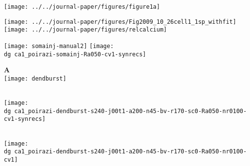 \documentclass{article}
\newcommand{\dg}{}              %
\newlength{\colwidth}
\newcommand{\figtitle}[1]{}
\begin{document}

\fontsize{8}{20}\selectfont

\figtitle{Figure 1}

\vspace{\baselineskip}

\noindent\texttt{[image: ../../journal-paper/figures/figure1a]}
\begin{minipage}[b]{0.5\colwidth}
\texttt{[image: ../../journal-paper/figures/Fig2009\_10\_26cell1\_1sp\_withfit]}  
\texttt{[image: ../../journal-paper/figures/relcalcium]}  
\end{minipage}
\texttt{[image: somainj-manual2]}
\texttt{[image: \\dg ca1\_poirazi-somainj-Ra050-cv1-synrecs]}





\pagebreak[4]

\figtitle{Figure 2}

\vspace{\baselineskip}

\noindent
\begin{minipage}[t]{0.5\colwidth}
  \textbf{A}\\
    \texttt{[image: dendburst]}
\end{minipage}
\begin{minipage}[t]{0.5\colwidth}
  \mbox{}\\[-0.5\baselineskip]
  \texttt{[image: \\dg ca1\_poirazi-dendburst-s240-j00t1-a200-n45-bv-r170-sc0-Ra050-nr0100-cv1-synrecs]}  
\end{minipage}\\
\noindent\texttt{[image: \\dg ca1\_poirazi-dendburst-s240-j00t1-a200-n45-bv-r170-sc0-Ra050-nr0100-cv1]}
\end{document}
